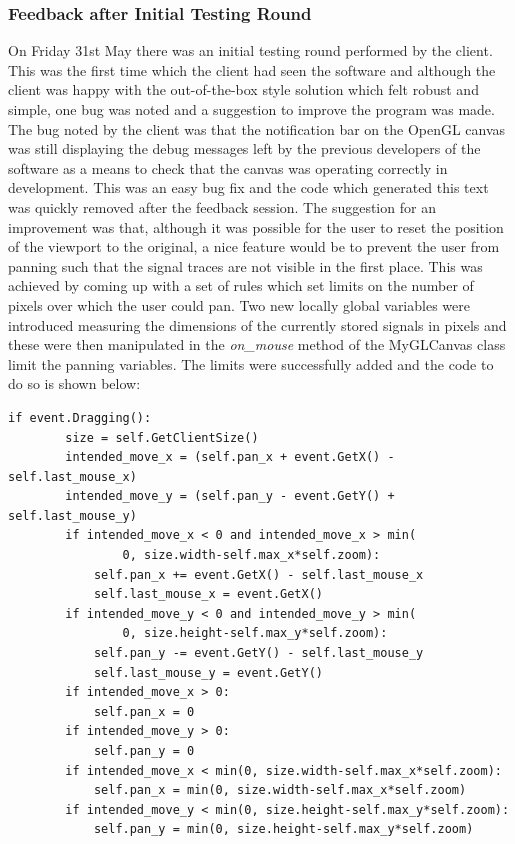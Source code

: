 \documentclass{article}					%
\begin{document}
\subsubsection{Feedback after Initial Testing Round}
On Friday 31st May there was an initial testing round performed by the client. This was the first time which the client had seen the software and although the client was happy with the out-of-the-box style solution which felt robust and simple, one bug was noted and a suggestion to improve the program was made. The bug noted by the client was that the notification bar on the OpenGL canvas was still displaying the debug messages left by the previous developers of the software as a means to check that the canvas was operating correctly in development. This was an easy bug fix and the code which generated this text was quickly removed after the feedback session. The suggestion for an improvement was that, although it was possible for the user to reset the position of the viewport to the original, a nice feature would be to prevent the user from panning such that the signal traces are not visible in the first place. This was achieved by coming up with a set of rules which set limits on the number of pixels over which the user could pan. Two new locally global variables were introduced measuring the dimensions of the currently stored signals in pixels and these were then manipulated in the \textit{on\_mouse} method of the MyGLCanvas class limit the panning variables. The limits were successfully added and the code to do so is shown below:
\begin{verbatim}
if event.Dragging():
        size = self.GetClientSize()
        intended_move_x = (self.pan_x + event.GetX() - self.last_mouse_x)
        intended_move_y = (self.pan_y - event.GetY() + self.last_mouse_y)
        if intended_move_x < 0 and intended_move_x > min(
                0, size.width-self.max_x*self.zoom):
            self.pan_x += event.GetX() - self.last_mouse_x
            self.last_mouse_x = event.GetX()
        if intended_move_y < 0 and intended_move_y > min(
                0, size.height-self.max_y*self.zoom):
            self.pan_y -= event.GetY() - self.last_mouse_y
            self.last_mouse_y = event.GetY()
        if intended_move_x > 0:
            self.pan_x = 0
        if intended_move_y > 0:
            self.pan_y = 0
        if intended_move_x < min(0, size.width-self.max_x*self.zoom):
            self.pan_x = min(0, size.width-self.max_x*self.zoom)
        if intended_move_y < min(0, size.height-self.max_y*self.zoom):
            self.pan_y = min(0, size.height-self.max_y*self.zoom)
\end{verbatim}
\end{document}
